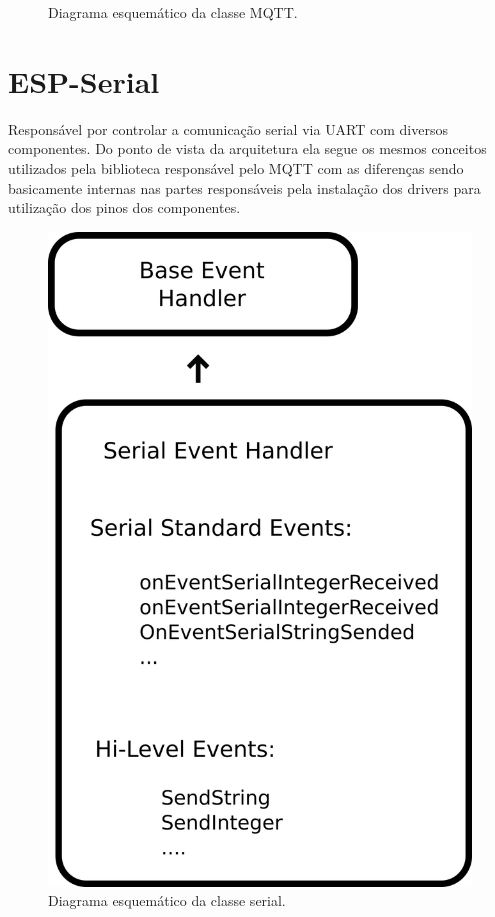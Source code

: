 \begin{figure}[htb]
\begin{center}
	\end{center}
	\caption{\label{fig:mqtt} Diagrama esquemático da classe MQTT.} 
\end{figure}


\section{ESP-Serial}

Responsável por controlar a comunicação serial via \ac{UART} com diversos componentes. Do ponto de vista da arquitetura
ela segue os mesmos conceitos utilizados pela biblioteca responsável pelo \ac{MQTT} com as diferenças sendo basicamente
internas nas partes responsáveis pela instalação dos drivers para utilização dos pinos dos componentes.

\begin{figure}[htb]
    \begin{center}
	    \includegraphics[scale=0.5]{figs/serial-dia.png}
	\end{center}
	\caption{\label{fig:serial} Diagrama esquemático da classe serial.} 
\end{figure}

